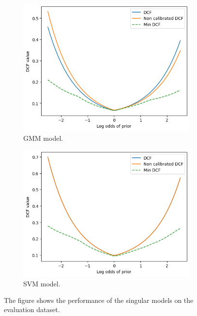 \documentclass{article}
\begin{document}
\begin{figure}[ht]
    \centering
    \begin{subfigure}[b]{0.45\textwidth}
        \centering
        \includegraphics[width=\textwidth]{images/evaluation_gmm.png}
        \caption{GMM model.}
    \end{subfigure}
    \hfill
    \begin{subfigure}[b]{0.45\textwidth}
        \centering
        \includegraphics[width=\textwidth]{images/evaluation_svm.png}
        \caption{SVM model.}
    \end{subfigure}
    \caption{The figure shows the performance of the singular models on the evaluation dataset.}
    \label{fig:evaluation_comparison}
\end{figure}
\end{document}
